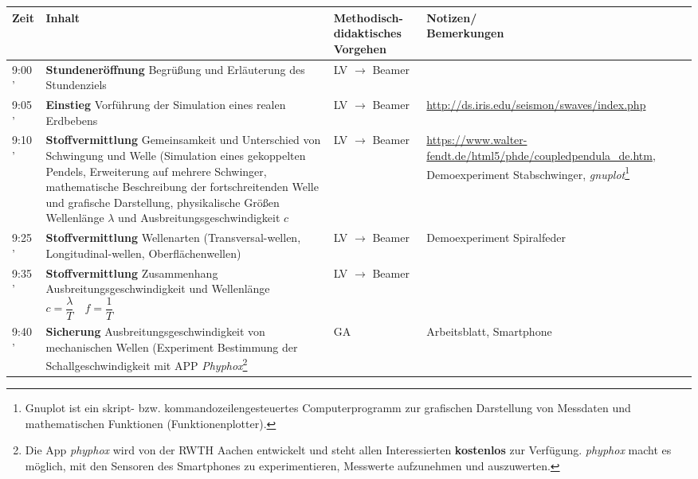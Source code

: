 \documentclass[10pt,paper=A4,paper=landscape,headinclude=true,DIV=20]{scrartcl}
\newcommand{\phyphox}{\textit{phyphox} }
\newcommand{\zeit}[2]{#1 \newline \newline #2'}
\begin{document}
\begin{xltabular}{1\textwidth}{|p{2.4em}|p{14cm}|p{6cm}|X|}
\hline 
Zeit & Inhalt & Methodisch-didaktisches Vorgehen & {Notizen/ \newline Bemerkungen} \\
\hline\endhead
\zeit{9:00}{5}& \textbf{Stundeneröffnung} Begrüßung und Erläuterung des Stundenziels & LV $\rightarrow$ Beamer &\\
\hline
\zeit{9:05}{5}& \textbf{Einstieg} Vorführung der Simulation eines realen Erdbebens & LV $\rightarrow$ Beamer & \url{http://ds.iris.edu/seismon/swaves/index.php} \\
\hline
\zeit{9:10}{15}& \textbf{Stoffvermittlung} Gemeinsamkeit und Unterschied von Schwingung und Welle (Simulation eines gekoppelten Pendels, Erweiterung auf mehrere Schwinger, mathematische Beschreibung der fortschreitenden Welle und grafische Darstellung, physikalische Größen Wellenlänge $\lambda$ und Ausbreitungsgeschwindigkeit $c$ & LV $\rightarrow$ Beamer & \url{https://www.walter-fendt.de/html5/phde/coupledpendula_de.htm}, Demoexperiment Stabschwinger, \textit{gnuplot}\footnote{Gnuplot ist ein skript- bzw. kommandozeilengesteuertes Computerprogramm zur grafischen Darstellung von Messdaten und mathematischen Funktionen (Funktionenplotter).} \\
\hline
\zeit{9:25}{10}& \textbf{Stoffvermittlung} Wellenarten (Transversal-wellen, Longitudinal-wellen, Oberflächenwellen) & LV $\rightarrow$ Beamer & Demoexperiment Spiralfeder \\
\hline
\zeit{9:35}{5}& \textbf{Stoffvermittlung} Zusammenhang Ausbreitungsgeschwindigkeit und Wellenlänge \newline $c=\dfrac{\lambda}{T}\quad f=\dfrac{1}{T}$ & LV $\rightarrow$ Beamer & \\
\hline
\zeit{9:40}{20}& \textbf{Sicherung} Ausbreitungsgeschwindigkeit von mechanischen Wellen (Experiment Bestimmung der Schallgeschwindigkeit mit APP \textit{Phyphox}\footnote{Die App \phyphox wird von der RWTH Aachen entwickelt und steht allen Interessierten \textbf{kostenlos} zur Verfügung. \phyphox macht es möglich, mit den Sensoren des Smartphones zu experimentieren, Messwerte aufzunehmen und auszuwerten.}  & GA & Arbeitsblatt, Smartphone \\
\hline


\end{xltabular}
\end{document}

